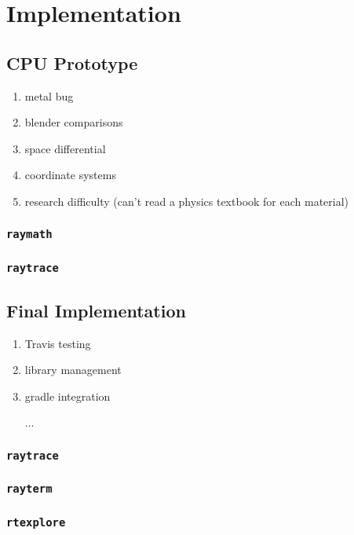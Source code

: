%
%
%
\chapter{Implementation}\label{ch:implementation}

\section{CPU Prototype}\label{ch:implementation:prototype}

\begin{enumerate}
  \item metal bug
  \item blender comparisons
  \item space differential
  \item coordinate systems
  \item research difficulty (can't read a physics textbook for each material)
\end{enumerate}

\subsection{\texttt{raymath}}\label{ch:implementation:prototype:raymath}

\subsection{\texttt{raytrace}}\label{ch:implementation:prototype:raytrace}

\section{Final Implementation}\label{ch:implementation:final}

\begin{enumerate}
  \item Travis testing
  \item library management
  \item gradle integration
  \item [...]
\end{enumerate}

\subsection{\texttt{raytrace}}\label{ch:implementation:final:raytrace}

\subsection{\texttt{rayterm}}\label{ch:implementation:final:rayterm}

\subsection{\texttt{rtexplore}}\label{ch:implementation:final:rtexplore}

